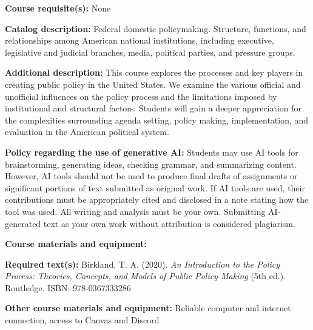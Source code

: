 \documentclass[12pt]{article}     %
\begin{document}
\vspace{0.5em}
\begin{flatlist}
\item \textbf{Course requisite(s):} None
\item \textbf{Catalog description:} Federal domestic policymaking. Structure, functions, and relationships among American national institutions, including executive, legislative and judicial branches, media, political parties, and pressure groups.
\item \textbf{Additional description:} This course explores the processes and key players in creating public policy in the United States. We examine the various official and unofficial influences on the policy process and the limitations imposed by institutional and structural factors. Students will gain a deeper appreciation for the complexities surrounding agenda setting, policy making, implementation, and evaluation in the American political system.
\item \textbf{Policy regarding the use of generative AI:} Students may use AI tools for brainstorming, generating ideas, checking grammar, and summarizing content. However, AI tools should not be used to produce final drafts of assignments or significant portions of text submitted as original work. If AI tools are used, their contributions must be appropriately cited and disclosed in a note stating how the tool was used. All writing and analysis must be your own. Submitting AI-generated text as your own work without attribution is considered plagiarism.
\item \textbf{Course materials and equipment:} ~
\item \textbf{Required text(s):} Birkland, T. A. (2020). \emph{An Introduction to the Policy Process: Theories, Concepts, and Models of Public Policy Making} (5th ed.). Routledge. ISBN: 978-0367333286
\item \textbf{Other course materials and equipment:} Reliable computer and internet connection, access to Canvas and Discord
\end{flatlist}
\end{document}
